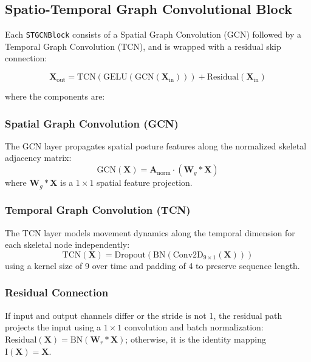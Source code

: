 \documentclass[conference]{IEEEtran}
\begin{document}
\subsection{Spatio-Temporal Graph Convolutional Block}

Each \texttt{STGCNBlock} consists of a Spatial Graph Convolution (GCN) followed by a
Temporal Graph Convolution (TCN), and is wrapped with a residual skip connection:

\begin{equation}
\mathbf{X}_{\mathrm{out}} = \mathrm{TCN}\left(\mathrm{GELU}\left(\mathrm{GCN}(\mathbf{X}_{\mathrm{in}})\right)\right) + \mathrm{Residual}(\mathbf{X}_{\mathrm{in}})
\label{eq:stgcnblock}
\end{equation}

\noindent where the components are:

\subsubsection{Spatial Graph Convolution (GCN)}
The GCN layer propagates spatial posture features along the normalized skeletal adjacency matrix:
\begin{equation}
\mathrm{GCN}(\mathbf{X}) = \mathbf{A}_{\mathrm{norm}} \cdot (\mathbf{W}_g \ast \mathbf{X})
\label{eq:gcn}
\end{equation}
\noindent where $\mathbf{W}_g \ast \mathbf{X}$ is a $1\times1$ spatial feature projection.

\subsubsection{Temporal Graph Convolution (TCN)}
The TCN layer models movement dynamics along the temporal dimension for each skeletal node independently:
\begin{equation}
\mathrm{TCN}(\mathbf{X}) = \mathrm{Dropout}\left(\mathrm{BN}\left(\mathrm{Conv2D}_{9\times1}(\mathbf{X})\right)\right)
\label{eq:tcn}
\end{equation}
\noindent using a kernel size of 9 over time and padding of 4 to preserve sequence length.

\subsubsection{Residual Connection}
If input and output channels differ or the stride is not 1, the residual path projects the input using a $1\times1$ convolution and batch normalization: $\mathrm{Residual}(\mathbf{X}) = \mathrm{BN}(\mathbf{W}_r \ast \mathbf{X})$; otherwise, it is the identity mapping $\mathrm{I}(\mathbf{X}) = \mathbf{X}$.
\end{document}
